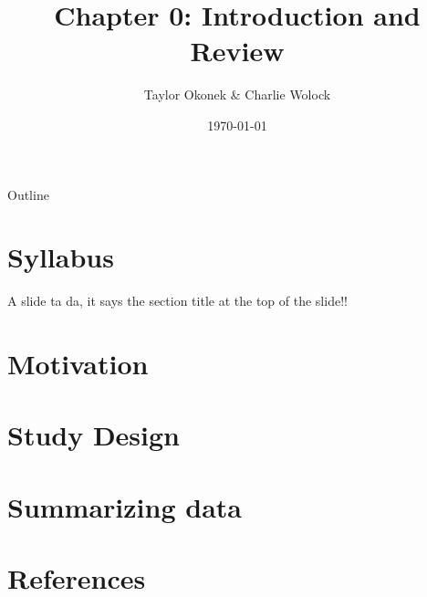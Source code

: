 \documentclass{beamer}
\title{Chapter 0: Introduction and Review}
\author{Taylor Okonek \& Charlie Wolock}
\date{\today}
\begin{document}
\begin{frame}
    \titlepage 
\end{frame}
\begin{frame}{Outline}
    \tableofcontents
\end{frame}


\section{Syllabus}

\begin{frame}{A slide}
    ta da, it says the section title at the top of the slide!!
\end{frame}

\section{Motivation}

\section{Study Design}

\section{Summarizing data}

\section*{References}
\begin{frame}
\end{frame}
 
\end{document}

